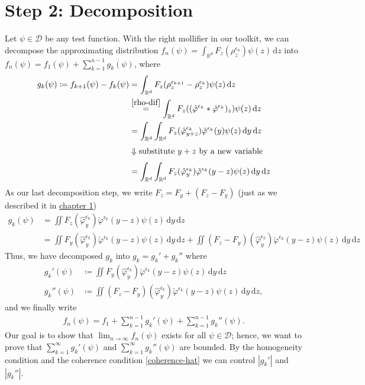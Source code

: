 \section{Step 2: Decomposition}\label{step2:decomposition}

Let $\psi \in \mathcal{D}$ be any test function. With the right mollifier in our toolkit, we can decompose the approximating distribution $f_n(\psi) = \int_{\mathbb{R}^d} F_z(\rho_z^{\epsilon_n}) \psi(z)\, \mathrm{d}z$ into $f_n(\psi) = f_1(\psi) + \sum^{n-1}_{k=1} g_k(\psi)$, where
\begin{align*}
    g_k(\psi) \coloneqq f_{k+1}(\psi) - f_k(\psi) 
    &= \int_{\mathbb{R}^d} F_z(\rho_z^{\epsilon_{k+1}} - \rho_z^{\epsilon_k}) \psi(z)\, \mathrm{d}z \\
    &\overset{\eqref{rho-dif}}{=} \int_{\mathbb{R}^d} F_z((\hat \varphi^{\epsilon_k} * \check \varphi^{\epsilon_k} )_z) \psi(z)\, \mathrm{d}z \\
    &= \int_{\mathbb{R}^d} \int_{\mathbb{R}^{d}} F_z(\hat{\varphi}^{\epsilon_k}_{y+z}) \check \varphi^
    {\epsilon_k}(y) \psi(z) \, \mathrm{d}y \, \mathrm{d}z \\
    \\[-1.2em]
    &\Downarrow \text{substitute $y+z$ by a new variable} \\
    \\[-1.2em]
    &= \int_{\mathbb{R}^d} \int_{\mathbb{R}^{d}} F_z(\hat{\varphi}^{\epsilon_k}_{y}) \check \varphi^{\epsilon_k}(y-z) \psi(z) \, \mathrm{d}y \, \mathrm{d}z
\end{align*}
As our last decomposition step, we write $F_z = F_y + (F_z - F_y)$ (just as we described it in \hyperref[sec:motiadsd]{chapter 1})
\begin{align*}
    g_k(\psi) &= \iint F_z(\hat{\varphi}^{\epsilon_k}_{y}) \check \varphi^{\epsilon_k}(y-z) \psi(z) \, \mathrm{d}y \, \mathrm{d}z \\
    &=  \iint F_y(\hat{\varphi}^{\epsilon_k}_{y}) \check \varphi^{\epsilon_k}(y-z) \psi(z) \, \mathrm{d}y \, \mathrm{d}z +  \iint (F_z - F_y)(\hat{\varphi}^{\epsilon_k}_{y}) \check \varphi^{\epsilon_k}(y-z) \psi(z) \, \mathrm{d}y \, \mathrm{d}z
\end{align*}
Thus, we have decomposed $g_k$ into $g_k = g_k' + g_k''$ where 
\begin{align*}
    g_k'(\psi) &\coloneqq \iint F_y(\hat{\varphi}^{\epsilon_k}_{y}) \check \varphi^{\epsilon_k}(y-z) \psi(z) \, \mathrm{d}y \, \mathrm{d}z \\
    g_k''(\psi) & \coloneqq \iint (F_z - F_y)(\hat{\varphi}^{\epsilon_k}_{y}) \check \varphi^{\epsilon_k}(y-z) \psi(z) \, \mathrm{d}y \, \mathrm{d}z,
\end{align*}
and we finally write 
\begin{align}\label{approximating-distributions-alternative}
    f_n(\psi) = f_1 + \sum^{n-1}_{k=1} g_k'(\psi) + \sum^{n-1}_{k=1} g_k''(\psi).
\end{align}
Our goal is to show that $\lim_{n \to \infty}f_n(\psi)$ exists for all $\psi \in \mathcal{D}$; hence, we want to prove that $ \sum^{\infty}_{k=1} g_k'(\psi)$ and $ \sum^{\infty}_{k=1} g_k''(\psi)$ are bounded. By the homogeneity condition and the coherence condition \eqref{coherence-hat} we can control $|g_k'|$ and $|g_k''|$.

